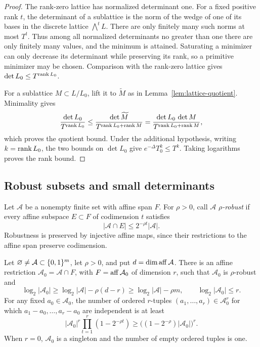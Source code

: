 \begin{proof}
The rank-zero lattice has normalized determinant one. For a fixed
positive rank \(t\), the determinant of a sublattice is the norm of
the wedge of one of its bases in the discrete lattice
\(\bigwedge^t L\). There are only finitely many such norms at most
\(T^t\). Thus among all normalized determinants no greater than
one there are only finitely many values, and the minimum is
attained. Saturating a minimizer can only decrease its determinant
while preserving its rank, so a primitive minimizer may be chosen.
Comparison with the rank-zero lattice gives
\(\det L_0\le T^{\operatorname{rank} L_0}\).

For a sublattice \(M\subset L/L_0\), lift it to \(\widetilde M\)
as in Lemma~\ref{lem:lattice-quotient}. Minimality gives
\[
 \frac{\det L_0}{T^{\operatorname{rank} L_0}}
 \le
 \frac{\det\widetilde M}{T^{\operatorname{rank} L_0+\operatorname{rank} M}}
 =
 \frac{\det L_0\,\det M}{T^{\operatorname{rank} L_0+\operatorname{rank} M}},
\]
which proves the quotient bound. Under the additional hypothesis,
writing \(k=\operatorname{rank} L_0\), the two bounds on \(\det L_0\) give
\(e^{-\Delta}T_0^k\le T^k\). Taking logarithms proves the rank
bound.
\end{proof}

\subsection{Robust subsets and small determinants}

Let \(\mathcal A\) be a nonempty finite set with affine span \(F\).
For \(\rho>0\), call \(\mathcal A\) \emph{\(\rho\)-robust} if every
affine subspace \(E\subset F\) of codimension \(t\) satisfies
\[
 |\mathcal A\cap E|\le 2^{-\rho t}|\mathcal A|.
\]
Robustness is preserved by injective affine maps, since their
restrictions to the affine span preserve codimension.

\begin{lemma}\label{lem:robust-extraction}
Let \(\varnothing\ne\mathcal A\subset\{0,1\}^m\), let \(\rho>0\),
and put \(d=\dim\operatorname{aff}\mathcal A\). There is an affine restriction
\(\mathcal A_0=\mathcal A\cap F\), with
\(F=\operatorname{aff}\mathcal A_0\) of dimension \(r\), such that
\(\mathcal A_0\) is \(\rho\)-robust and
\[
 \log_2|\mathcal A_0|
 \ge \log_2|\mathcal A|-\rho(d-r)
 \ge \log_2|\mathcal A|-\rho m,
 \qquad
 \log_2|\mathcal A_0|\le r.
\]
For any fixed \(a_0\in\mathcal A_0\), the number of ordered
\(r\)-tuples \((a_1,\ldots,a_r)\in\mathcal A_0^r\) for which
\(a_1-a_0,\ldots,a_r-a_0\) are independent is at least
\[
 |\mathcal A_0|^r\prod_{t=1}^r(1-2^{-\rho t})
 \ge \bigl((1-2^{-\rho})|\mathcal A_0|\bigr)^r.
\]
When \(r=0\), \(\mathcal A_0\) is a singleton and the number of
empty ordered tuples is one.
\end{lemma}

